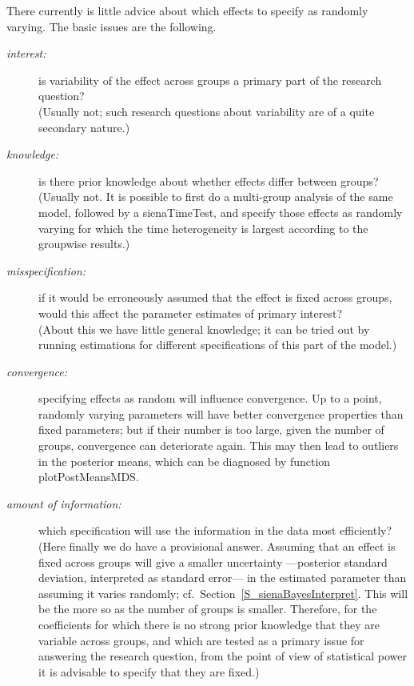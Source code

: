 \documentclass[a4paper,fleqn,11pt]{article}
\newcommand{\+}{\, + \,}
\newcommand{\sfn}[1]{\textsf{#1}}
\begin{document}
There currently is little advice about which effects to specify
as randomly varying.
The basic issues are the following.
\begin{description}
\item[\emph{interest:}] is variability of the effect across groups
   a primary part of the research question?\\
   (Usually not; such research questions about variability
   are of a quite secondary nature.)
\item[\emph{knowledge:}] is there prior knowledge about whether
   effects differ between groups?\\
   (Usually not. It is possible to first do a multi-group analysis of the same model,
   followed by a \textsf{sienaTimeTest}, and specify those effects as randomly
   varying for which the time heterogeneity is largest according to the
   groupwise results.)
\item[\emph{misspecification:}] if it would be erroneously assumed
    that the effect is fixed across groups, would this affect
    the parameter estimates of primary interest?\\
    (About this we have little general knowledge; it can be tried out
    by running estimations for different specifications of this
    part of the model.)
\item[\emph{convergence:}] specifying effects as random will
    influence convergence. Up to a point, randomly varying parameters
    will have better convergence properties than fixed parameters;
    but if their number is too large, given the number of groups,
    convergence can deteriorate again.
    This may then lead to outliers in the posterior means,
    which can be diagnosed by function \sfn{plotPostMeansMDS}.
\item[\emph{amount of information:}] which specification will
     use the information in the data most efficiently?\\
     (Here finally we do have a provisional answer. Assuming that an effect is fixed
     across groups will give a smaller uncertainty ---posterior standard
     deviation, interpreted as standard error--- in the estimated parameter
     than assuming it varies randomly;
     cf.\ Section~\ref{S_sienaBayesInterpret}.
     This will be the more so as the number of
     groups is smaller. Therefore, for the coefficients for which
     there is no strong prior knowledge that they are variable across groups,
     and which are tested as a primary issue for answering the research question,
     from the point of view of statistical power
     it is advisable to specify that they are fixed.)
\end{description}
\end{document}
